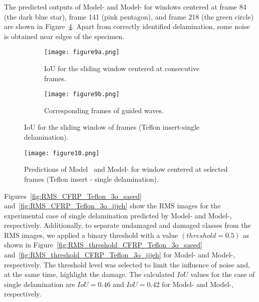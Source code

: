 The predicted outputs of Model- and Model- for windows centered 
at frame 84 (the dark blue star), frame 141 (pink pentagon), and frame 218 (the 
green circle) are shown in Figure~\ref{fig:CFRP_Teflon_3o_predictions}.
Apart from correctly identified delamination, some noise is obtained near edges of the specimen.
\begin{figure} [!h]
	\begin{subfigure}[b]{0.5\textwidth}
		\centering
		\texttt{[image: figure9a.png]}
		\caption{\centering IoU for the sliding window centered at consecutive 
		frames.}
		\label{fig:CFRP_Teflon_3o_IoU_}
	\end{subfigure}
	\par\medskip
	\begin{subfigure}[b]{0.5\textwidth}
		\centering
		\texttt{[image: figure9b.png]}
		\caption{\centering Corresponding frames of guided waves.} 
		\label{fig:CFRP_teflon_3o_shapes_}
	\end{subfigure}
	\caption{IoU for the sliding window of frames (Teflon insert-single delamination).}
	\label{fig:CFRP_Teflon_3o_IoU_centre_window}
\end{figure} 
\begin{figure}[!h]
	\centering
	\texttt{[image: figure10.png]}
	\caption{Predictions of Model~ and Model- for window centered at selected frames (Teflon insert - single delamination).}
	\label{fig:CFRP_Teflon_3o_predictions}
\end{figure}

Figures~\ref{fig:RMS_CFRP_Teflon_3o_saeed} and~\ref{fig:RMS_CFRP_Teflon_3o_ijjeh} show the RMS images for the experimental case of single delamination predicted by Model- and Model-, respectively.
Additionally, to separate undamaged and damaged classes from the RMS images, we 
applied a binary threshold with a value \((threshold=0.5)\) as shown in 
Figure~\ref{fig:RMS_threshold_CFRP_Teflon_3o_saeed} 
and~\ref{fig:RMS_threshold_CFRP_Teflon_3o_ijjeh} for Model- and 
Model-, respectively. 
The threshold level was selected to limit the influence of noise and, at the same time, highlight the damage.
The calculated \(IoU\) values for the case of single delamination are \(IoU=0.46\) and \(IoU=0.42\) for Model- and Model-, respectively.

